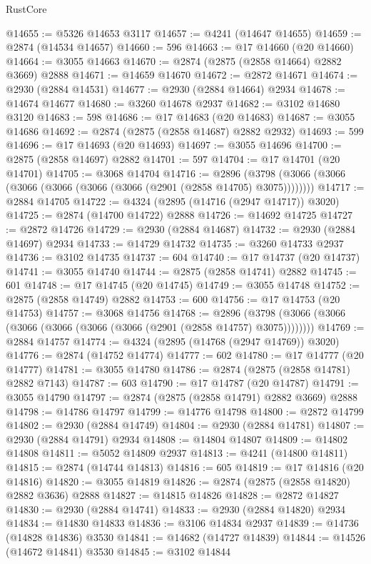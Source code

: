 \begin{lexlean}{RustCore}
\begin{coremodule}
@14655 := @5326 @14653 @3117
@14657 := @4241 (@14647 @14655)
@14659 := @2874 (@14534 @14657)
@14660 := 596
@14663 := @17 @14660 (@20 @14660)
@14664 := @3055 @14663
@14670 := @2874 (@2875 (@2858 @14664) @2882 @3669) @2888
@14671 := @14659 @14670
@14672 := @2872 @14671
@14674 := @2930 (@2884 @14531)
@14677 := @2930 (@2884 @14664) @2934
@14678 := @14674 @14677
@14680 := @3260 @14678 @2937
@14682 := @3102 @14680 @3120
@14683 := 598
@14686 := @17 @14683 (@20 @14683)
@14687 := @3055 @14686
@14692 := @2874 (@2875 (@2858 @14687) @2882 @2932)
@14693 := 599
@14696 := @17 @14693 (@20 @14693)
@14697 := @3055 @14696
@14700 := @2875 (@2858 @14697) @2882
@14701 := 597
@14704 := @17 @14701 (@20 @14701)
@14705 := @3068 @14704
@14716 := @2896 (@3798 (@3066 (@3066 (@3066 (@3066 (@3066 (@3066 (@2901 (@2858 @14705) @3075))))))))
@14717 := @2884 @14705
@14722 := @4324 (@2895 (@14716 (@2947 @14717)) @3020)
@14725 := @2874 (@14700 @14722) @2888
@14726 := @14692 @14725
@14727 := @2872 @14726
@14729 := @2930 (@2884 @14687)
@14732 := @2930 (@2884 @14697) @2934
@14733 := @14729 @14732
@14735 := @3260 @14733 @2937
@14736 := @3102 @14735
@14737 := 604
@14740 := @17 @14737 (@20 @14737)
@14741 := @3055 @14740
@14744 := @2875 (@2858 @14741) @2882
@14745 := 601
@14748 := @17 @14745 (@20 @14745)
@14749 := @3055 @14748
@14752 := @2875 (@2858 @14749) @2882
@14753 := 600
@14756 := @17 @14753 (@20 @14753)
@14757 := @3068 @14756
@14768 := @2896 (@3798 (@3066 (@3066 (@3066 (@3066 (@3066 (@3066 (@2901 (@2858 @14757) @3075))))))))
@14769 := @2884 @14757
@14774 := @4324 (@2895 (@14768 (@2947 @14769)) @3020)
@14776 := @2874 (@14752 @14774)
@14777 := 602
@14780 := @17 @14777 (@20 @14777)
@14781 := @3055 @14780
@14786 := @2874 (@2875 (@2858 @14781) @2882 @7143)
@14787 := 603
@14790 := @17 @14787 (@20 @14787)
@14791 := @3055 @14790
@14797 := @2874 (@2875 (@2858 @14791) @2882 @3669) @2888
@14798 := @14786 @14797
@14799 := @14776 @14798
@14800 := @2872 @14799
@14802 := @2930 (@2884 @14749)
@14804 := @2930 (@2884 @14781)
@14807 := @2930 (@2884 @14791) @2934
@14808 := @14804 @14807
@14809 := @14802 @14808
@14811 := @5052 @14809 @2937
@14813 := @4241 (@14800 @14811)
@14815 := @2874 (@14744 @14813)
@14816 := 605
@14819 := @17 @14816 (@20 @14816)
@14820 := @3055 @14819
@14826 := @2874 (@2875 (@2858 @14820) @2882 @3636) @2888
@14827 := @14815 @14826
@14828 := @2872 @14827
@14830 := @2930 (@2884 @14741)
@14833 := @2930 (@2884 @14820) @2934
@14834 := @14830 @14833
@14836 := @3106 @14834 @2937
@14839 := @14736 (@14828 @14836) @3530
@14841 := @14682 (@14727 @14839)
@14844 := @14526 (@14672 @14841) @3530
@14845 := @3102 @14844

\end{coremodule}
\end{lexlean}
